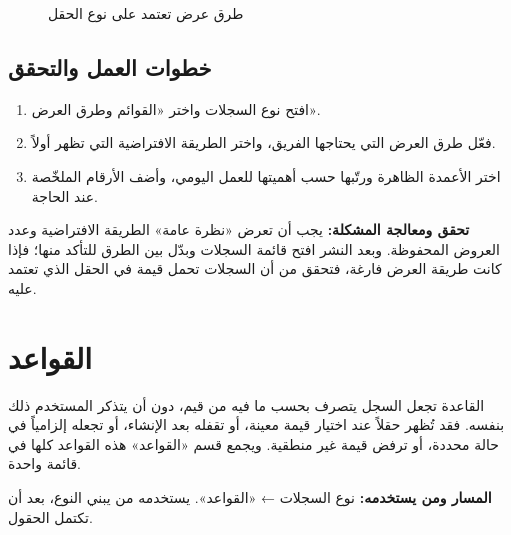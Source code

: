 \begin{figure}[H]
\centering
{}
\rclegend
\caption{طرق عرض تعتمد على نوع الحقل}
\label{fig:builder-lists-depends}
\end{figure}

\subsection{خطوات العمل والتحقق}
\begin{enumerate}
\item افتح نوع السجلات واختر «القوائم وطرق العرض».
\item فعّل طرق العرض التي يحتاجها الفريق، واختر الطريقة الافتراضية التي تظهر أولاً.
\item اختر الأعمدة الظاهرة ورتّبها حسب أهميتها للعمل اليومي، وأضف الأرقام الملخّصة عند الحاجة.
\end{enumerate}

\textbf{تحقق ومعالجة المشكلة:} يجب أن تعرض «نظرة عامة» الطريقة الافتراضية وعدد العروض المحفوظة. وبعد النشر افتح قائمة السجلات وبدّل بين الطرق للتأكد منها؛ فإذا كانت طريقة العرض فارغة، فتحقق من أن السجلات تحمل قيمة في الحقل الذي تعتمد عليه.

\clearpage
\section{القواعد}
\label{sec:builder-feature-rules}

القاعدة تجعل السجل يتصرف بحسب ما فيه من قيم، دون أن يتذكر المستخدم ذلك بنفسه. فقد تُظهر حقلاً عند اختيار قيمة معينة، أو تقفله بعد الإنشاء، أو تجعله إلزامياً في حالة محددة، أو ترفض قيمة غير منطقية. ويجمع قسم «القواعد» هذه القواعد كلها في قائمة واحدة.

\textbf{المسار ومن يستخدمه:} نوع السجلات ← «القواعد». يستخدمه من يبني النوع، بعد أن تكتمل الحقول.

